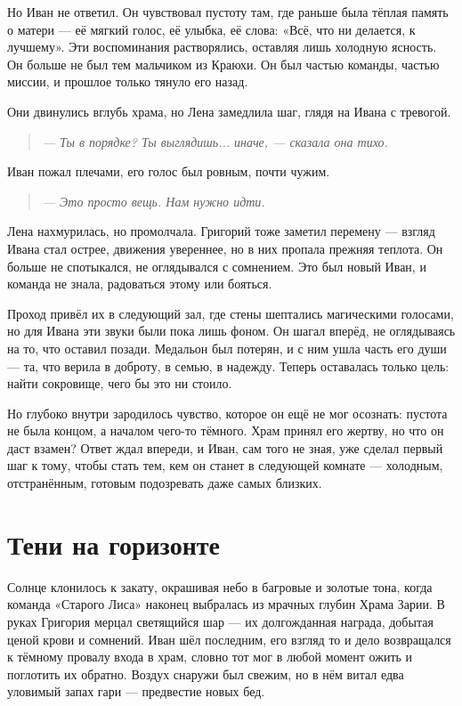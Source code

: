 \documentclass[12pt,a4paper]{book}
\newenvironment{dialogue}{\begin{quote}\itshape}{\end{quote}}
\begin{document}
Но Иван не ответил. Он чувствовал пустоту там, где раньше была тёплая память о матери --- её мягкий голос, её улыбка, её слова: «Всё, что ни делается, к лучшему». Эти воспоминания растворялись, оставляя лишь холодную ясность. Он больше не был тем мальчиком из Краюхи. Он был частью команды, частью миссии, и прошлое только тянуло его назад.

Они двинулись вглубь храма, но Лена замедлила шаг, глядя на Ивана с тревогой.

\begin{dialogue}
--- Ты в порядке? Ты выглядишь... иначе, --- сказала она тихо.
\end{dialogue}

Иван пожал плечами, его голос был ровным, почти чужим.

\begin{dialogue}
--- Это просто вещь. Нам нужно идти.
\end{dialogue}

Лена нахмурилась, но промолчала. Григорий тоже заметил перемену --- взгляд Ивана стал острее, движения увереннее, но в них пропала прежняя теплота. Он больше не спотыкался, не оглядывался с сомнением. Это был новый Иван, и команда не знала, радоваться этому или бояться.

Проход привёл их в следующий зал, где стены шептались магическими голосами, но для Ивана эти звуки были пока лишь фоном. Он шагал вперёд, не оглядываясь на то, что оставил позади. Медальон был потерян, и с ним ушла часть его души --- та, что верила в доброту, в семью, в надежду. Теперь оставалась только цель: найти сокровище, чего бы это ни стоило.

Но глубоко внутри зародилось чувство, которое он ещё не мог осознать: пустота не была концом, а началом чего-то тёмного. Храм принял его жертву, но что он даст взамен? Ответ ждал впереди, и Иван, сам того не зная, уже сделал первый шаг к тому, чтобы стать тем, кем он станет в следующей комнате --- холодным, отстранённым, готовым подозревать даже самых близких.

\chapter{Тени на горизонте}

Солнце клонилось к закату, окрашивая небо в багровые и золотые тона, когда команда «Старого Лиса» наконец выбралась из мрачных глубин Храма Зарии. В руках Григория мерцал светящийся шар --- их долгожданная награда, добытая ценой крови и сомнений. Иван шёл последним, его взгляд то и дело возвращался к тёмному провалу входа в храм, словно тот мог в любой момент ожить и поглотить их обратно. Воздух снаружи был свежим, но в нём витал едва уловимый запах гари --- предвестие новых бед.
\end{document}
